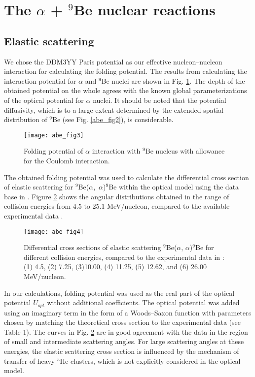\documentclass[
12pt, %
oneside, %
english, %
onehalfspacing, %
onehalfspacing, %
headsepline, %
]{MastersDoctoralThesis} %
\begin{document}
\newpage
\section{The $\alpha$ + $^9$Be nuclear reactions}
\subsection{Elastic scattering}
We chose the DDM3YY Paris potential \cite{anantaraman1983effective} as our effective nucleon–nucleon interaction for calculating the folding potential. 
The results from calculating the interaction potential for $\alpha$ and ${}^9$Be nuclei are shown in Fig. \ref{abe_fig3}.
 The depth of the obtained potential on the whole agrees with the known global parameterizations of the optical potential for $\alpha$ nuclei. 
 It should be noted that the potential diffusivity, which is to a large extent determined by the extended spatial distribution of ${}^9$Be (see Fig. \ref{abe_fig2}), is considerable.


\begin{figure}
\centering
\texttt{[image: abe\_fig3]}
\decoRule
\caption{  \footnotesize  Folding potential of $\alpha$ interaction with $^9$Be nucleus with allowance for the Coulomb interaction.
}
\label{abe_fig3}
\end{figure}


The obtained folding potential was used to calculate the differential cross section of elastic scattering for ${}^9$Be($\alpha$,~$\alpha$)${}^9$Be within the optical model using the data base in \citep{nrv}. 
Figure \ref{abe_fig4} shows the angular distributions obtained in the range of collision energies from 4.5 to 25.1 MeV/nucleon, compared to the available experimental data \cite{lucas1964scattering,burtebaev2002,hauser1969elastic}. 

\begin{figure}[tp]
\centering
\texttt{[image: abe\_fig4]}
\decoRule
\caption{  \footnotesize   Differential cross sections of elastic scattering ${}^9$Be($\alpha$, $\alpha$)${}^9$Be for different collision energies, compared to the experimental data in \cite{lucas1964scattering,burtebaev2002,hauser1969elastic} : (1) 4.5, (2) 7.25, (3)10.00, (4) 11.25, (5) 12.62, and (6) 26.00 MeV/nucleon.
}
\label{abe_fig4}
\end{figure}


In our calculations, folding potential   was used as the real part of the optical potential  $U_{opt}$ without additional coefficients.
 The optical potential was added using an imaginary term in the form of a Woods–Saxon function with parameters chosen by matching the theoretical cross section to the experimental data (see Table 1).
  The curves in Fig. \ref{abe_fig4} are in good agreement with the data in the region of small and intermediate scattering angles. 
  For large scattering angles at these energies, the elastic scattering cross section is influenced by the mechanism of transfer of heavy $^5$He clusters, which is not explicitly considered in the optical model.
\end{document}
